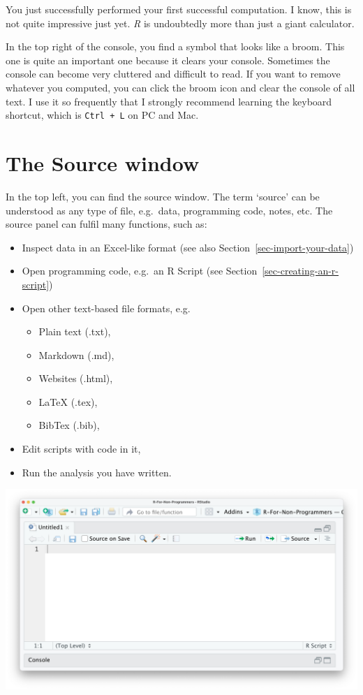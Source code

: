 \documentclass[
  letterpaper,
]{krantz}
\begin{document}
You just successfully performed your first successful computation. I
know, this is not quite impressive just yet. \emph{R} is undoubtedly
more than just a giant calculator.

In the top right of the console, you find a symbol that looks like a
broom. This one is quite an important one because it clears your
console. Sometimes the console can become very cluttered and difficult
to read. If you want to remove whatever you computed, you can click the
broom icon and clear the console of all text. I use it so frequently
that I strongly recommend learning the keyboard shortcut, which is
\texttt{Ctrl\ +\ L} on PC and Mac.

\section{The Source window}\label{sec-the-source-window}

In the top left, you can find the source window. The term `source' can
be understood as any type of file, e.g.~data, programming code, notes,
etc. The source panel can fulfil many functions, such as:

\begin{itemize}
\item
  Inspect data in an Excel-like format (see also
  Section~\ref{sec-import-your-data})
\item
  Open programming code, e.g.~an R Script (see
  Section~\ref{sec-creating-an-r-script})
\item
  Open other text-based file formats, e.g.

  \begin{itemize}
  \item
    Plain text (.txt),
  \item
    Markdown (.md),
  \item
    Websites (.html),
  \item
    LaTeX (.tex),
  \item
    BibTex (.bib),
  \end{itemize}
\item
  Edit scripts with code in it,
\item
  Run the analysis you have written.
\end{itemize}

\includegraphics{images/chapter_04_img/03_source_window/01_rstudio_source.png}
\end{document}
